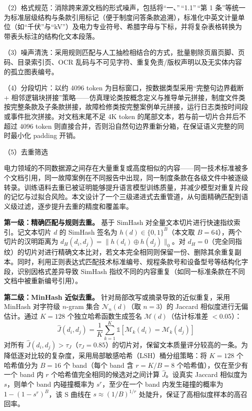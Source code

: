 \documentclass[fontset=fandol,type=master,campus=shenzhen,etitleauto=true]{hithesisbook}
\begin{document}
\noindent （2）格式规范：消除跨来源文档的形式噪声，包括将``一、''\,``1.1''\,``第 1 条''等统一为标准层级结构与条款引用标记（便于制度问答条款追溯），标准化中英文计量单位（如``千伏''与``kV''）及电力专业符号、希腊字母与下标，并将复杂表格转换为带表头标注的结构化文本段落。

\noindent （3）噪声清洗：采用规则匹配与人工抽检相结合的方式，批量剔除页眉页脚、页码、目录索引页、OCR 乱码与不可见字符、重复免责/版权声明以及无实体内容的孤立图表编号。

\noindent （4）分段切片：以约 4096 token 为目标窗口，按数据类型采用``完整句边界截断 + 相邻逻辑块拼接''策略——仿真理论类按概念定义与推导单元拼接，制度文件类按完整条款及子条款拼接，故障检修类按完整案例单元拼接，运行日志类按时间段或事件批次拼接。对文档末尾不足 4K token 的尾部文本，若与前一切片合并后不超过 4096 token 则直接合并，否则沿自然句边界重新分箱，在保证语义完整的同时最小化 padding 开销。

\noindent （5）去重筛选

电力领域的不同数据源之间存在大量重复或高度相似的内容------同一技术标准被多个文档引用，同一故障案例在不同报告中出现，同一制度条款在各级文件中被逐级转录。训练语料去重已被证明能够提升语言模型训练质量，并减少模型对重复片段的记忆与过拟合风险\cite{ref57}。本文设计了一个三级递进式去重管道，从句面精确匹配到语义级过滤，逐步提升去重的精度和覆盖率。

\textbf{第一级：精确匹配与规则去重。} 基于 SimHash 对全量文本切片进行快速指纹索引\cite{ref59,ref60}。记文本切片 $d$ 的 SimHash 签名为 $h(d) \in \{0,1\}^{B}$（本文取 $B = 64$），两个切片的汉明距离为 $d_H(d_i, d_j) = \|h(d_i) \oplus h(d_j)\|_0$。对 $d_H = 0$（完全同指纹）的切片对进行精确文本比对，若文本完全相同则保留一份、删除其余重复副本。同时，利用正则表达式匹配技术标准编号、规程条款号和设备型号等结构化字段，识别因格式差异导致 SimHash 指纹不同的内容重复（如同一标准条款在不同文档中被重新编号引用）。

\textbf{第二级：MinHash 近似去重。} 针对局部改写或摘录导致的近似重复，采用 MinHash 对字符级 $n$-gram 集合 $\mathcal{N}_n(d)$（取 $n = 3$）的 Jaccard 相似度进行无偏估计\cite{ref61}。通过 $K = 128$ 个独立哈希函数生成签名 $\mathcal{M}(d)$（估计标准差 $< 0.05$）：
\begin{equation}
\hat{J}(d_i, d_j) = \frac{1}{K} \sum_{k=1}^{K} \mathbb{1}\left[\mathcal{M}_k(d_i) = \mathcal{M}_k(d_j)\right]
\end{equation}
对所有 $\hat{J}(d_i, d_j) > \tau_J$（$\tau_J = 0.85$）的切片对，保留文本质量评分较高的一条。为降低逐对比较的复杂度，采用局部敏感哈希（LSH）桶分组策略\cite{ref62}：将 $K=128$ 个哈希值分为 $B=16$ 个 band（每个 band 含 $r = K/B = 8$ 个哈希值），仅在至少有一个 band 内 $r$ 个哈希值完全相同的候选对之间计算 $\hat{J}$。设真实 Jaccard 相似度为 $s$，则单个 band 内碰撞概率为 $s^r$，至少在一个 band 内发生碰撞的概率为 $1 - (1 - s^r)^B$，该 S 曲线在 $s \approx (1/B)^{1/r}$ 处陡升，保证了高相似度样本的高召回率。
\end{document}
